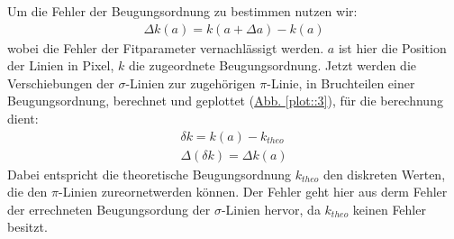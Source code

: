         Um die Fehler der Beugungsordnung zu bestimmen nutzen wir:
        \begin{align}
          \Delta k(a) = k(a+\Delta a) - k(a)
        \end{align}
        wobei die Fehler der Fitparameter vernachlässigt werden. $a$ ist hier die Position der Linien in Pixel, $k$ die zugeordnete Beugungsordnung. Jetzt werden die Verschiebungen der $\sigma$-Linien zur zugehörigen $\pi$-Linie, in Bruchteilen einer Beugungsordnung, berechnet und geplottet (\hyperref[plot::3]{Abb. \ref*{plot::3}}), für die berechnung dient:
        \begin{align}
          \delta k = k(a) - k_{theo}\\
          \Delta (\delta k) = \Delta k(a)
        \end{align}
        Dabei entspricht die theoretische Beugungsordnung $k_{theo}$ den diskreten Werten, die den $\pi$-Linien zureornetwerden können. Der Fehler geht hier aus derm Fehler der errechneten Beugungsordung der $\sigma$-Linien hervor, da $k_{theo}$ keinen Fehler besitzt.

